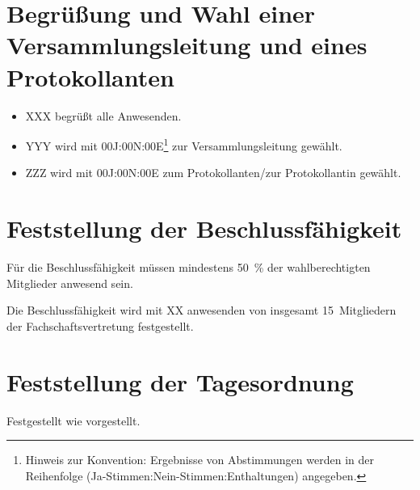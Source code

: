 \documentclass[sitzung=fsv-konstituierend]{fsphys-protokoll}
\begin{document}
	
\section{Begrüßung und Wahl einer Versammlungsleitung und eines Protokollanten}
\begin{itemize}
	\item XXX begrüßt alle Anwesenden.
	\item YYY wird mit 00J:00N:00E\footnote{Hinweis zur Konvention: Ergebnisse von Abstimmungen werden in der Reihenfolge (Ja-Stimmen:Nein-Stimmen:Enthaltungen) angegeben.} zur Versammlungsleitung gewählt.
	\item ZZZ wird mit 00J:00N:00E zum Protokollanten/zur Protokollantin gewählt.
\end{itemize}

\section{Feststellung der Beschlussfähigkeit}
Für die Beschlussfähigkeit müssen mindestens \SI{50}{\percent} der wahlberechtigten Mitglieder anwesend sein.

Die Beschlussfähigkeit wird mit XX anwesenden von insgesamt 15~Mitgliedern der Fachschaftsvertretung festgestellt.

\section{Feststellung der Tagesordnung}
Festgestellt wie vorgestellt.
\end{document}
